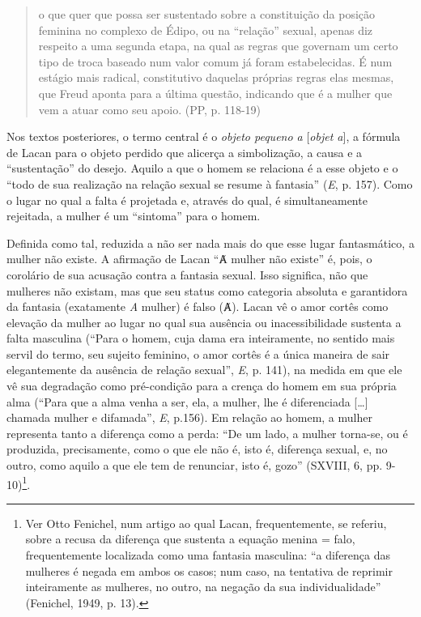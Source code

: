 \begin{quote}
o que quer que possa ser sustentado sobre a constituição da posição
feminina no complexo de Édipo, ou na ``relação'' sexual, apenas diz
respeito a uma segunda etapa, na qual as regras que governam um certo
tipo de troca baseado num valor comum já foram estabelecidas. É num
estágio mais radical, constitutivo daquelas próprias regras elas mesmas,
que Freud aponta para a última questão, indicando que é a mulher que vem
a atuar como seu apoio. (PP, p. 118-19)
\end{quote}

Nos textos posteriores, o termo central é o \emph{objeto pequeno a}
{[}\emph{objet a}{]}, a fórmula de Lacan para o objeto perdido que
alicerça a simbolização, a causa e a ``sustentação'' do desejo. Aquilo a
que o homem se relaciona é a esse objeto e o ``todo de sua realização na
relação sexual se resume à fantasia'' (\emph{E}, p. 157). Como o lugar
no qual a falta é projetada e, através do qual, é simultaneamente
rejeitada, a mulher é um ``sintoma'' para o homem.

Definida como tal, reduzida a não ser nada mais do que esse lugar
fantasmático, a mulher não existe. A afirmação de Lacan ``Ⱥ mulher não
existe'' é, pois, o corolário de sua acusação contra a fantasia sexual.
Isso significa, não que mulheres não existam, mas que seu status como
categoria absoluta e garantidora da fantasia (exatamente \emph{A}
mulher) é falso (Ⱥ). Lacan vê o amor cortês como elevação da mulher ao
lugar no qual sua ausência ou inacessibilidade sustenta a falta
masculina (``Para o homem, cuja dama era inteiramente, no sentido mais
servil do termo, seu sujeito feminino, o amor cortês é a única maneira
de sair elegantemente da ausência de relação sexual'', \emph{E}, p.
141), na medida em que ele vê sua degradação como pré-condição para a
crença do homem em sua própria alma (``Para que a alma venha a ser, ela,
a mulher, lhe é diferenciada {[}\ldots{}{]} chamada mulher e difamada'',
\emph{E}, p.156). Em relação ao homem, a mulher representa tanto a
diferença como a perda: ``De um lado, a mulher torna-se, ou é produzida,
precisamente, como o que ele não é, isto é, diferença sexual, e, no
outro, como aquilo a que ele tem de renunciar, isto é, gozo'' (SXVIII,
6, pp. 9-10)\footnote{Ver Otto Fenichel, num artigo ao qual Lacan,
  frequentemente, se referiu, sobre a recusa da diferença que sustenta a
  equação menina = falo, frequentemente localizada como uma fantasia
  masculina: ``a diferença das mulheres é negada em ambos os casos; num
      caso, na tentativa de reprimir inteiramente as mulheres, no outro, na
      negação da sua individualidade'' (Fenichel, 1949, p. 13).}.

